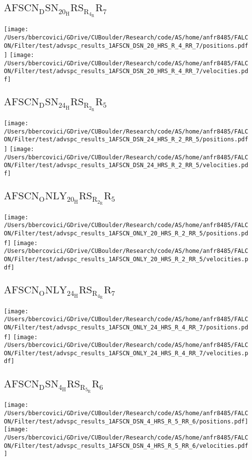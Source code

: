 \subsection{$\mathrm{AFSCN_DSN_20_HRS_R_4_RR_7}$}
\texttt{[image: /Users/bbercovici/GDrive/CUBoulder/Research/code/AS/home/anfr8485/FALCON/Filter/test/advspc\_results\_1AFSCN\_DSN\_20\_HRS\_R\_4\_RR\_7/positions.pdf]}
\texttt{[image: /Users/bbercovici/GDrive/CUBoulder/Research/code/AS/home/anfr8485/FALCON/Filter/test/advspc\_results\_1AFSCN\_DSN\_20\_HRS\_R\_4\_RR\_7/velocities.pdf]}
\subsection{$\mathrm{AFSCN_DSN_24_HRS_R_2_RR_5}$}
\texttt{[image: /Users/bbercovici/GDrive/CUBoulder/Research/code/AS/home/anfr8485/FALCON/Filter/test/advspc\_results\_1AFSCN\_DSN\_24\_HRS\_R\_2\_RR\_5/positions.pdf]}
\texttt{[image: /Users/bbercovici/GDrive/CUBoulder/Research/code/AS/home/anfr8485/FALCON/Filter/test/advspc\_results\_1AFSCN\_DSN\_24\_HRS\_R\_2\_RR\_5/velocities.pdf]}
\subsection{$\mathrm{AFSCN_ONLY_20_HRS_R_2_RR_5}$}
\texttt{[image: /Users/bbercovici/GDrive/CUBoulder/Research/code/AS/home/anfr8485/FALCON/Filter/test/advspc\_results\_1AFSCN\_ONLY\_20\_HRS\_R\_2\_RR\_5/positions.pdf]}
\texttt{[image: /Users/bbercovici/GDrive/CUBoulder/Research/code/AS/home/anfr8485/FALCON/Filter/test/advspc\_results\_1AFSCN\_ONLY\_20\_HRS\_R\_2\_RR\_5/velocities.pdf]}
\subsection{$\mathrm{AFSCN_ONLY_24_HRS_R_4_RR_7}$}
\texttt{[image: /Users/bbercovici/GDrive/CUBoulder/Research/code/AS/home/anfr8485/FALCON/Filter/test/advspc\_results\_1AFSCN\_ONLY\_24\_HRS\_R\_4\_RR\_7/positions.pdf]}
\texttt{[image: /Users/bbercovici/GDrive/CUBoulder/Research/code/AS/home/anfr8485/FALCON/Filter/test/advspc\_results\_1AFSCN\_ONLY\_24\_HRS\_R\_4\_RR\_7/velocities.pdf]}
\subsection{$\mathrm{AFSCN_DSN_4_HRS_R_5_RR_6}$}
\texttt{[image: /Users/bbercovici/GDrive/CUBoulder/Research/code/AS/home/anfr8485/FALCON/Filter/test/advspc\_results\_1AFSCN\_DSN\_4\_HRS\_R\_5\_RR\_6/positions.pdf]}
\texttt{[image: /Users/bbercovici/GDrive/CUBoulder/Research/code/AS/home/anfr8485/FALCON/Filter/test/advspc\_results\_1AFSCN\_DSN\_4\_HRS\_R\_5\_RR\_6/velocities.pdf]}
